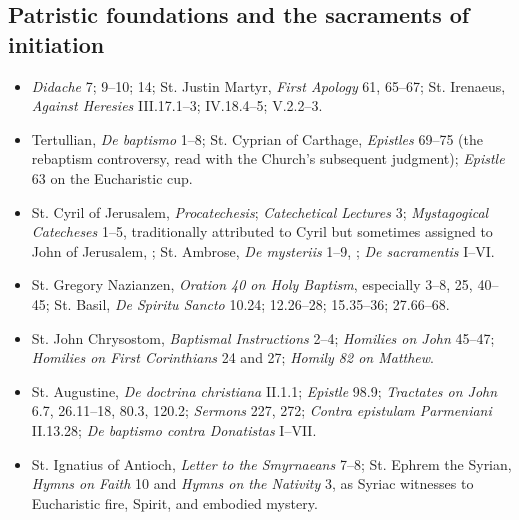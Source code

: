 \subsection*{Patristic foundations and the sacraments of initiation}
{\footnotesize
\begin{itemize}[itemsep=0.18em,topsep=0.25em]
\item \emph{Didache} 7; 9--10; 14; St. Justin Martyr, \emph{First Apology} 61, 65--67; St. Irenaeus, \emph{Against Heresies} III.17.1--3; IV.18.4--5; V.2.2--3.
\item Tertullian, \emph{De baptismo} 1--8; St. Cyprian of Carthage, \emph{Epistles} 69--75 (the rebaptism controversy, read with the Church's subsequent judgment); \emph{Epistle} 63 on the Eucharistic cup.
\item St. Cyril of Jerusalem, \emph{Procatechesis}; \emph{Catechetical Lectures} 3; \emph{Mystagogical Catecheses} 1--5, traditionally attributed to Cyril but sometimes assigned to John of Jerusalem, ; St. Ambrose, \emph{De mysteriis} 1--9, ; \emph{De sacramentis} I--VI.
\item St. Gregory Nazianzen, \emph{Oration 40 on Holy Baptism}, especially 3--8, 25, 40--45; St. Basil, \emph{De Spiritu Sancto} 10.24; 12.26--28; 15.35--36; 27.66--68.
\item St. John Chrysostom, \emph{Baptismal Instructions} 2--4; \emph{Homilies on John} 45--47; \emph{Homilies on First Corinthians} 24 and 27; \emph{Homily 82 on Matthew}.
\item St. Augustine, \emph{De doctrina christiana} II.1.1; \emph{Epistle} 98.9; \emph{Tractates on John} 6.7, 26.11--18, 80.3, 120.2; \emph{Sermons} 227, 272; \emph{Contra epistulam Parmeniani} II.13.28; \emph{De baptismo contra Donatistas} I--VII.
\item St. Ignatius of Antioch, \emph{Letter to the Smyrnaeans} 7--8; St. Ephrem the Syrian, \emph{Hymns on Faith} 10 and \emph{Hymns on the Nativity} 3, as Syriac witnesses to Eucharistic fire, Spirit, and embodied mystery.
\end{itemize}
}


